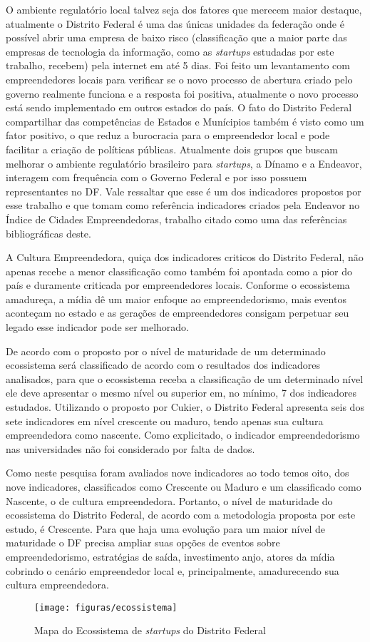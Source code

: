 O ambiente regulatório local talvez seja dos fatores que merecem maior destaque, atualmente o Distrito Federal é uma das únicas unidades da federação onde é possível abrir uma empresa de baixo risco (classificação que a maior parte das empresas de tecnologia da informação, como as \textit{startups} estudadas por este trabalho, recebem) pela internet em até 5 dias. Foi feito um levantamento com empreendedores locais para verificar se o novo processo de abertura criado pelo governo realmente funciona e a resposta foi positiva, atualmente o novo processo está sendo implementado em outros estados do país. O fato do Distrito Federal compartilhar das competências de Estados e Munícipios também é visto como um fator positivo, o que reduz a burocracia para o empreendedor local e pode facilitar a criação de políticas públicas. Atualmente dois grupos que buscam melhorar o ambiente regulatório brasileiro para \textit{startups}, a Dínamo e a Endeavor, interagem com frequência com o Governo Federal e por isso possuem representantes no DF. Vale ressaltar que esse é um dos indicadores propostos por esse trabalho e que tomam como referência indicadores criados pela Endeavor no Índice de Cidades Empreendedoras, trabalho citado como uma das referências bibliográficas deste.

A Cultura Empreendedora, quiça dos indicadores criticos do Distrito Federal, não apenas recebe a menor classificação como também foi apontada como a pior do país e duramente criticada por empreendedores locais. Conforme o ecossistema amadureça, a mídia dê um maior enfoque ao empreendedorismo, mais eventos aconteçam no estado e as gerações de empreendedores consigam perpetuar seu legado esse indicador pode ser melhorado.

De acordo com o proposto por  o nível de maturidade de um determinado ecossistema será classificado de acordo com o resultados dos indicadores analisados, para que o ecossistema receba a classificação de um determinado nível ele deve apresentar o mesmo nível ou superior em, no mínimo, 7 dos indicadores estudados. Utilizando o proposto por Cukier, o Distrito Federal apresenta seis dos sete indicadores em nível crescente ou maduro, tendo apenas sua cultura empreendedora como nascente. Como explicitado, o indicador 
empreendedorismo nas universidades não foi considerado por falta de dados. 

Como neste pesquisa foram avaliados nove indicadores ao todo temos oito, dos nove indicadores, classificados como Crescente ou Maduro e um classificado como Nascente, o de cultura empreendedora. Portanto, o nível de maturidade do ecossistema do Distrito Federal, de acordo com a metodologia proposta por este estudo, é Crescente. Para que haja uma evolução para um maior nível de maturidade o DF precisa ampliar suas opções de eventos sobre empreendedorismo, estratégias de saída, investimento anjo, atores da mídia cobrindo o cenário empreendedor local e, principalmente, amadurecendo sua cultura empreendedora.

\begin{figure}[!htb]
	\centering
	\texttt{[image: figuras/ecossistema]}
	\caption{Mapa do Ecossistema de \textit{startups} do Distrito Federal}
	\label{figure:ecossistema}
\end{figure} 
